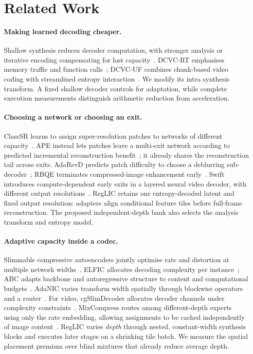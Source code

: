 \section{Related Work}
\label{sec:related}

\paragraph{Making learned decoding cheaper.}
Shallow synthesis reduces decoder computation, with stronger analysis
or iterative encoding compensating for lost capacity~\cite{yang2023shallow}.
DCVC-RT emphasises memory traffic and function calls~\cite{jia2025dcvcrt};
DCVC-UF combines chunk-based video coding with streamlined entropy
interaction~\cite{li2026dcvcuf}. We modify its intra synthesis transform.
A fixed shallow decoder controls for adaptation, while complete execution
measurements distinguish arithmetic reduction from acceleration.

\paragraph{Choosing a network or choosing an exit.}
ClassSR learns to assign super-resolution patches to networks of different
capacity~\cite{kong2021classsr}. APE instead lets patches leave a multi-exit
network according to predicted incremental reconstruction
benefit~\cite{wang2022ape}; it already shares the reconstruction tail across
exits. AdaRevD predicts patch difficulty to choose a deblurring
sub-decoder~\cite{mao2024adarevd}; RBQE terminates compressed-image
enhancement early~\cite{xing2020rbqe}. Swift introduces compute-dependent
early exits in a layered neural video decoder, with different output
resolutions~\cite{dasari2022swift}. RegLIC retains one entropy-decoded latent
and fixed output resolution: adapters align conditional feature tiles
before full-frame reconstruction. The proposed independent-depth bank
also selects the analysis transform and entropy model.

\paragraph{Adaptive capacity inside a codec.}
Slimmable compressive autoencoders jointly optimise rate and distortion
at multiple network widths~\cite{yang2021slimcae}. ELFIC allocates decoding
complexity per instance~\cite{zhang2023elfic}; ABC adapts backbone and
autoregressive structure to content and computational budgets~\cite{zhang2025abc}.
AdaNIC varies transform width spatially through blockwise operators
and a router~\cite{tao2023adanic}.
For video, cgSlimDecoder allocates decoder channels under complexity
constraints~\cite{hu2023cgslim}. MixCompress routes among different-depth
experts using only the rate embedding, allowing assignments to be
cached independently of image content~\cite{ta2026mixcompress}. RegLIC varies
\emph{depth} through nested, constant-width synthesis blocks and executes
later stages on a shrinking tile batch. We measure the spatial placement
premium over blind mixtures that already reduce average depth.

